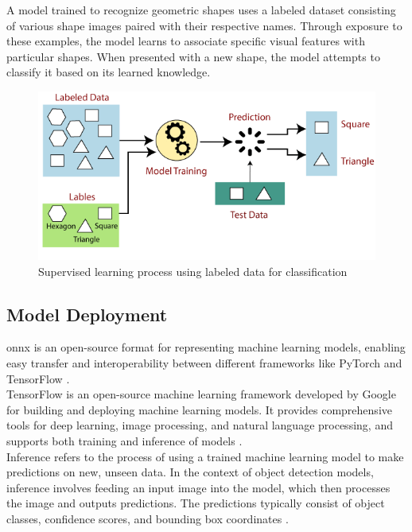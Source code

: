 A model trained to recognize geometric shapes uses a labeled dataset consisting of various shape images paired with their respective names. Through exposure to these examples, the model learns to associate specific visual features with particular shapes. When presented with a new shape, the model attempts to classify it based on its learned knowledge. \\

\begin{figure}[h!]
    \centering
    \includegraphics[width=0.75\linewidth]{figures/theory/machine-learning/supervised-learning.png}
    \caption[Supervised Learning with labeled data]{Supervised learning process using labeled data for classification \cite{tpointtech:supervised-learning}}
    \label{fig:supervised-learning}
\end{figure}

\subsection{Model Deployment}

\gls{onnx} is an open-source format for representing machine learning models, enabling easy transfer and interoperability between different frameworks like PyTorch and TensorFlow \cite{roboflow:onnx}. \\

TensorFlow is an open-source machine learning framework developed by Google for building and deploying machine learning models. It provides comprehensive tools for deep learning, image processing, and natural language processing, and supports both training and inference of models \cite{nvidia:tensorflow}. \\

Inference refers to the process of using a trained machine learning model to make predictions on new, unseen data. In the context of object detection models, inference involves feeding an input image into the model, which then processes the image and outputs predictions. The predictions typically consist of object classes, confidence scores, and bounding box coordinates \cite{nvidia:inference}. \\

